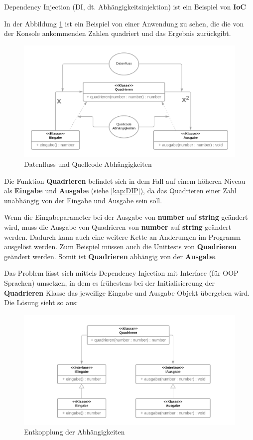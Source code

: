 Dependency Injection (DI, dt. Abhängigkeitsinjektion) ist ein Beispiel von \textbf{IoC}

In der Abbildung \ref{fig:dateflowVScodedep} ist ein Beispiel von einer Anwendung zu sehen, die die von der Konsole ankommenden Zahlen quadriert und das Ergebnis zurückgibt.
                
\begin{figure}[H]
    \centering
    \includegraphics[width=1\textwidth]{./images/DepInj_1.png}
    \caption{Datenfluss und Quellcode Abhängigkeiten}
    \label{fig:dateflowVScodedep}
\end{figure}

Die Funktion \textbf{Quadrieren} befindet sich in dem Fall auf einem höheren 
Niveau als \textbf{Eingabe} und \textbf{Ausgabe} (siehe \ref{kap:DIP}), 
da das Quadrieren einer Zahl unabhängig von der Eingabe und Ausgabe sein soll.

Wenn die Eingabeparameter bei der Ausgabe von \textbf{number} auf \textbf{string} geändert wird, 
muss die Ausgabe von Quadrieren von \textbf{number} auf \textbf{string} geändert werden.
Dadurch kann auch eine weitere Kette an Anderungen im Programm ausgelöst werden. 
Zum Beispiel müssen auch die Unittests von \textbf{Quadrieren} geändert werden.
Somit ist \textbf{Quadrieren} abhängig von der \textbf{Ausgabe}.

Das Problem lässt sich mittels Dependency Injection 
mit Interface (für OOP Sprachen) umsetzen, 
in dem es frühestens bei der Initialisiereung der \textbf{Quadrieren} 
Klasse das jeweilige Eingabe und Ausgabe Objekt übergeben wird.
Die Lösung sieht so aus: 
\begin{figure}[H]
    \centering
    \includegraphics[width=1\textwidth]{./images/DepInj_2.png}
    \caption{Entkopplung der Abhängigkeiten}
    \label{fig:strukturGoodDI}
\end{figure}

